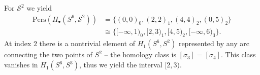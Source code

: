 \begin{example}{\cite[\S 2.4, Example]{de2011dualities}}
	For $\mathcal{S}^{2}$ we yield
	\begin{align}
		\mathrm{Pers}(H_{\bullet}(S^{6},\mathcal{S}^{2})) & = \{(0,0)_{0}, (2,2)_{1}, (4,4)_{2}, (0,5)_{2}\}               \\
		                                                  & \cong \{[-\infty, 1)_{0}, [2,3)_{1}, [4,5)_{2}, [-\infty,6)_{3}\}.
	\end{align}
	At index $2$ there is a nontrivial element of $H_{1}(S^{6},S^{2})$ represented
	by any arc connecting the two points of $S^{2}$ --
	the homology class is $[\sigma_{3}] = [\sigma_{4}]$. This class vanishes in $H_{1}(S^{6},S^{3})$, thus we yield the interval $[2,3)$.
\end{example}

